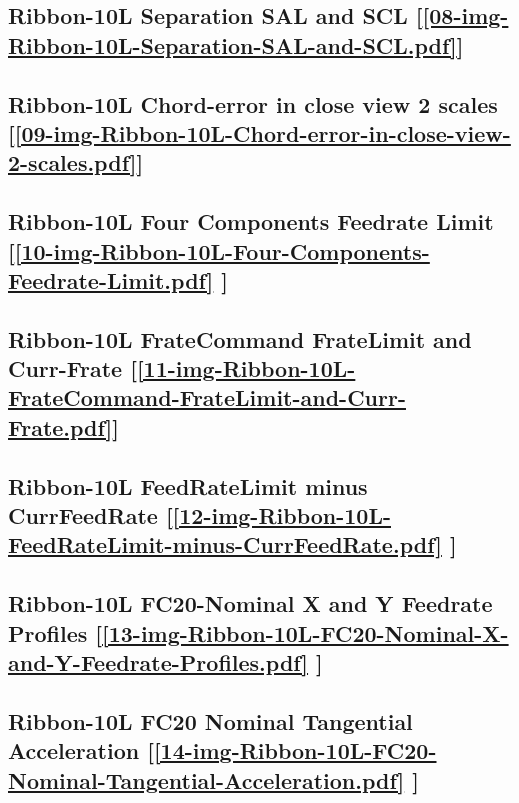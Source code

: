 \subsection       {Ribbon-10L Separation SAL and SCL
	[\ref      {08-img-Ribbon-10L-Separation-SAL-and-SCL.pdf}] }
\label{ssec-08-img-Ribbon-10L-Separation-SAL-and-SCL.pdf}

\subsection       {Ribbon-10L Chord-error in close view 2 scales
	[\ref      {09-img-Ribbon-10L-Chord-error-in-close-view-2-scales.pdf}] }
\label{ssec-09-img-Ribbon-10L-Chord-error-in-close-view-2-scales.pdf}

\subsection       {Ribbon-10L Four Components Feedrate Limit
	[\ref      {10-img-Ribbon-10L-Four-Components-Feedrate-Limit.pdf} ] }
\label{ssec-10-img-Ribbon-10L-Four-Components-Feedrate-Limit.pdf}

\subsection    {Ribbon-10L FrateCommand FrateLimit and Curr-Frate
	[\ref      {11-img-Ribbon-10L-FrateCommand-FrateLimit-and-Curr-Frate.pdf}] }
\label{ssec-11-img-Ribbon-10L-FrateCommand-FrateLimit-and-Curr-Frate.pdf}

\subsection     {Ribbon-10L FeedRateLimit minus CurrFeedRate
	[\ref      {12-img-Ribbon-10L-FeedRateLimit-minus-CurrFeedRate.pdf} ] }
\label{ssec-12-img-Ribbon-10L-FeedRateLimit-minus-CurrFeedRate.pdf}

\subsection     {Ribbon-10L FC20-Nominal X and Y Feedrate Profiles
	[\ref      {13-img-Ribbon-10L-FC20-Nominal-X-and-Y-Feedrate-Profiles.pdf} ] }
\label{ssec-13-img-Ribbon-10L-FC20-Nominal-X-and-Y-Feedrate-Profiles.pdf}

\subsection     {Ribbon-10L FC20 Nominal Tangential Acceleration
	[\ref      {14-img-Ribbon-10L-FC20-Nominal-Tangential-Acceleration.pdf} ] }
\label{ssec-14-img-Ribbon-10L-FC20-Nominal-Tangential-Acceleration.pdf}

